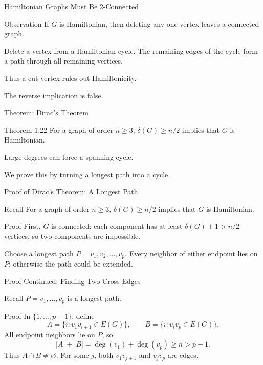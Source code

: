\documentclass[aspectratio=169,11pt]{beamer}
\begin{document}
\begin{frame}{Hamiltonian Graphs Must Be 2-Connected}
\large
\begin{block}{Observation}
If $G$ is Hamiltonian, then deleting any one vertex leaves a connected graph.
\end{block}
\medskip Delete a vertex from a Hamiltonian cycle. The remaining edges of the cycle form a path through all remaining vertices.\par\bigskip Thus a cut vertex rules out Hamiltonicity.\par\medskip The reverse implication is false.
\end{frame}

\begin{frame}{Theorem: Dirac's Theorem}
\large
\begin{block}{Theorem 1.22}
For a graph of order $n\ge3$, $\delta(G)\ge n/2$ implies that $G$ is Hamiltonian.
\end{block}
\bigskip Large degrees can force a spanning cycle.\par\medskip We prove this by turning a longest path into a cycle.
\end{frame}

\begin{frame}{Proof of Dirac's Theorem: A Longest Path}
\large
\begin{block}{Recall}
For a graph of order $n\ge3$, $\delta(G)\ge n/2$ implies that $G$ is Hamiltonian.
\end{block}
\begin{block}{Proof}
\normalsize First, $G$ is connected: each component has at least $\delta(G)+1>n/2$ vertices, so two components are impossible.\par\medskip Choose a longest path $P=v_1,v_2,\ldots,v_p$. Every neighbor of either endpoint lies on $P$; otherwise the path could be extended.
\end{block}

\end{frame}

\begin{frame}{Proof Continued: Finding Two Cross Edges}
\large
\begin{block}{Recall}
$P=v_1,\ldots,v_p$ is a longest path.
\end{block}
\begin{block}{Proof}
\normalsize In $\{1,\ldots,p-1\}$, define\[A=\{i:v_1v_{i+1}\in E(G)\},\qquad B=\{i:v_iv_p\in E(G)\}.\]All endpoint neighbors lie on $P$, so\[|A|+|B|=\deg(v_1)+\deg(v_p)\ge n>p-1.\]Thus $A\cap B\ne\varnothing$. For some $j$, both $v_1v_{j+1}$ and $v_jv_p$ are edges.
\end{block}

\end{frame}
\end{document}
